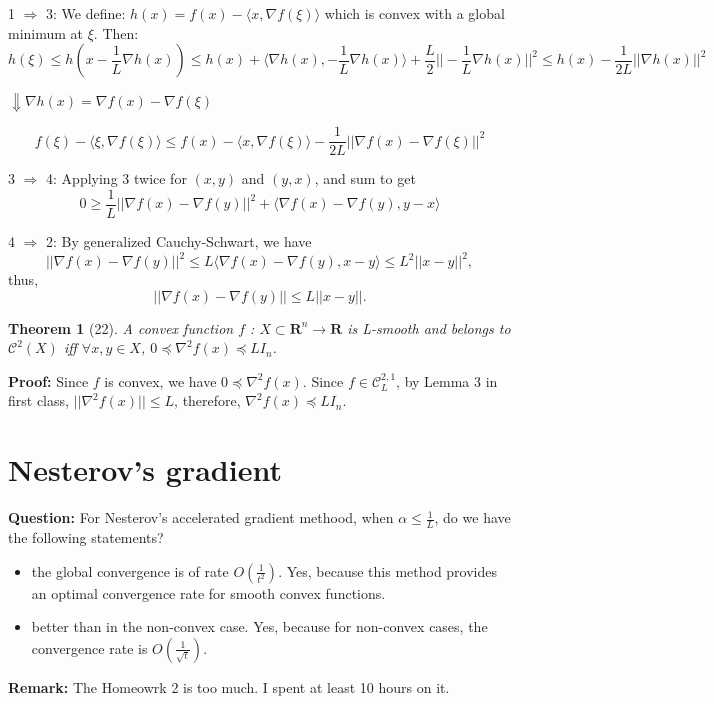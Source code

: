 \documentclass[12pt]{article}
\theoremstyle{mystyle}
\newtheorem{theorem}{Theorem}
\begin{document}
1 $\Rightarrow$ 3:
We define: $h(x) = f(x) - \langle x, \nabla f(\xi)\rangle$ which is convex with a global minimum at $\xi$. Then:
$$h(\xi) \leq h(x -\frac{1}{L}\nabla h(x)) \leq h(x) + \langle \nabla h(x), -\frac{1}{L}\nabla h(x)\rangle + \frac{L}{2}||-\frac{1}{L}\nabla h(x)||^2 \leq h(x) - \frac{1}{2L}||\nabla h(x)||^2$$
\begin{center}
$\Downarrow \nabla h(x) = \nabla f(x) - \nabla f(\xi)$ 
\end{center}
$$f(\xi) - \langle \xi, \nabla f(\xi)\rangle \leq f(x) - \langle x, \nabla f(\xi)\rangle - \frac{1}{2L}||\nabla f(x) - \nabla f(\xi)||^2$$ 

3 $\Rightarrow$ 4: Applying 3 twice for $(x,y)$ and $(y,x)$, and sum to get
$$0 \geq \frac{1}{L}||\nabla f(x) -\nabla f(y) ||^2 + \langle \nabla f(x) - \nabla f(y), y - x\rangle$$

4 $\Rightarrow$ 2: By generalized Cauchy-Schwart, we have
$$||\nabla f(x) -\nabla f(y) ||^2 \leq L \langle \nabla f(x) - \nabla f(y), x - y\rangle \leq L^2||x-y||^2,$$
thus,
$$||\nabla f(x) -\nabla f(y) || \leq  L||x-y||.$$

\begin{theorem}[22]
    A convex function $f$ : $X \subset \mathbf{R}^n \rightarrow \mathbf{R}$ is L-smooth and belongs to $\mathcal{C}^2(X)$ iff 
    $\forall x,y \in X$, $ 0 \preceq \nabla^2 f(x) \preceq LI_n$.
\end{theorem}
\textbf{Proof:} 
Since $f$ is convex, we have $0 \preceq \nabla^2 f(x)$.
Since $f \in \mathcal{C}^{2,1}_L$, by Lemma 3 in first class, $|| \nabla^2 f(x) ||\leq L$, therefore, $\nabla^2 f(x) \preceq LI_n$.

\section{Nesterov's gradient}
\textbf{Question: }For Nesterov's accelerated gradient methood, when $\alpha \leq \frac{1}{L}$, do we have the following statements?
\begin{itemize}
    \item the global convergence is of rate $O(\frac{1}{t^2})$. Yes, because this method provides an optimal convergence rate for smooth convex functions. 
    \item better than in the non-convex case. Yes, because for non-convex cases, the convergence rate is $O(\frac{1}{\sqrt{t}})$.
\end{itemize}

\textbf{Remark: } The Homeowrk 2 is too much. I spent at least 10 hours on it.
\end{document}
